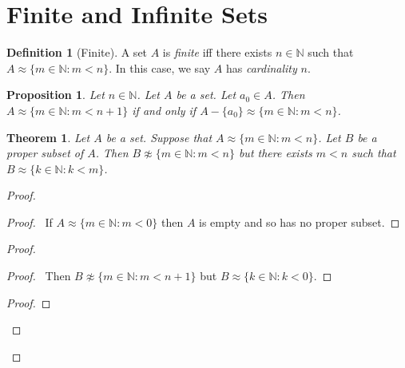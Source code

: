\documentclass{book}
\let\qed\relax
\newtheorem{prop}[ax]{Proposition}
\newtheorem{thm}[ax]{Theorem}
\theoremstyle{definition}
\newtheorem{df}[ax]{Definition}
\begin{document}
\section{Finite and Infinite Sets}

\begin{df}[Finite]
A set $A$ is \emph{finite} iff there exists $n \in \mathbb{N}$ such that $A \approx \{ m \in \mathbb{N} : m < n \}$. In this case, we say $A$ has \emph{cardinality} $n$.
\end{df}

\begin{prop}
Let $n \in \mathbb{N}$. Let $A$ be a set. Let $a_0 \in A$. Then $A \approx \{ m \in \mathbb{N} : m < n + 1 \}$ if and only if $A - \{a_0\} \approx \{ m \in \mathbb{N} : m < n \}$.
\end{prop}

\begin{thm}
Let $A$ be a set. Suppose that $A \approx \{ m \in \mathbb{N} : m < n \}$. Let $B$ be a proper subset of $A$. Then $B \not\approx \{ m \in \mathbb{N} : m < n \}$ but there exists $m < n$ such that $B \approx \{ k \in \mathbb{N} : k < m \}$.
\end{thm}

\begin{proof}
\pf
{}
\begin{proof}
	\pf\ If $A \approx \{ m \in \mathbb{N} : m < 0 \}$ then $A$ is empty and so has no proper subset.
\end{proof}
\begin{proof}
	\begin{proof}
		\pf\ Then $B \not\approx \{ m \in \mathbb{N} : m < n + 1\}$ but $B \approx \{ k \in \mathbb{N} : k < 0 \}$.
	\end{proof}
	\begin{proof}
	\end{proof}
\end{proof}
\qed
\end{proof}
\end{document}
